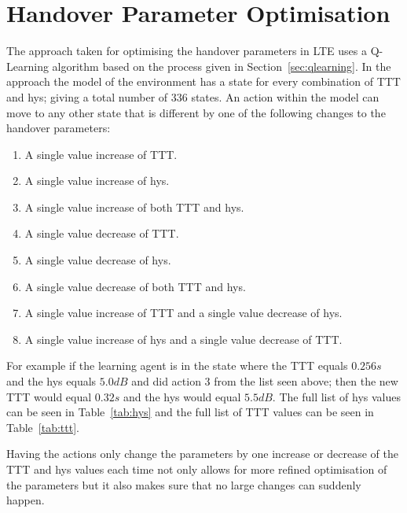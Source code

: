 \chapter{Handover Parameter Optimisation}\label{handover parameter optimisation}
The approach taken for optimising the handover parameters in LTE uses a Q-Learning algorithm based on the process given in Section~\ref{sec:qlearning}. In the approach the model of the environment has a state for every combination of TTT and hys; giving a total number of 336 states. An action within the model can move to any other state that is different by one of the following changes to the handover parameters:

\begin{enumerate}
	\item A single value increase of TTT.
	\item A single value increase of hys.
	\item A single value increase of both TTT and hys.
	\item A single value decrease of TTT.
	\item A single value decrease of hys.
	\item A single value decrease of both TTT and hys.
	\item A single value increase of TTT and a single value decrease of hys.
	\item A single value increase of hys and a single value decrease of TTT.
\end{enumerate}

For example if the learning agent is in the state where the TTT equals $0.256 s$ and the hys equals $5.0 dB$ and did action 3 from the list seen above; then the new TTT would equal $0.32 s$ and the hys would equal $5.5 dB$. The full list of hys values can be seen in Table~\ref{tab:hys} and the full list of TTT values can be seen in Table~\ref{tab:ttt}.

Having the actions only change the parameters by one increase or decrease of the TTT and hys values each time not only allows for more refined optimisation of the parameters but it also makes sure that no large changes can suddenly happen.

